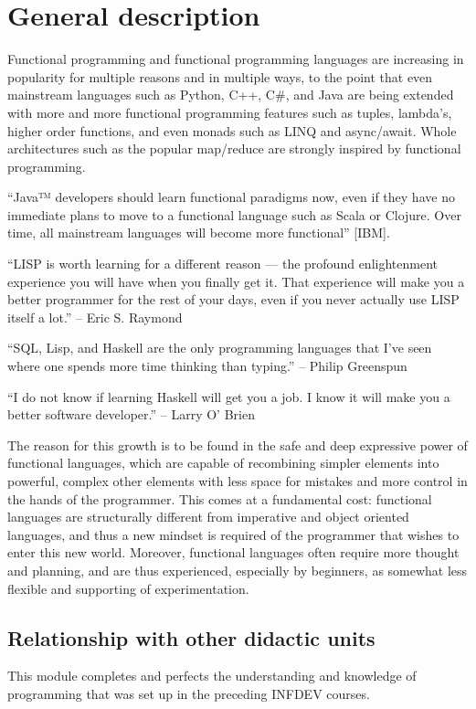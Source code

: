 \section{General description}

Functional programming and functional programming languages are increasing in popularity for multiple reasons and in multiple ways, to the point that even mainstream languages such as Python, C++, C\#, and Java are being extended with more and more functional programming features such as tuples, lambda's, higher order functions, and even monads such as LINQ and async/await. Whole architectures such as the popular map/reduce are strongly inspired by functional programming.

``Java™ developers should learn functional paradigms now, even if they have no immediate plans to move to a functional language such as Scala or Clojure. Over time, all mainstream languages will become more functional'' [IBM].

``LISP is worth learning for a different reason — the profound enlightenment experience you will have when you finally get it. That experience will make you a better programmer for the rest of your days, even if you never actually use LISP itself a lot.'' – Eric S. Raymond

``SQL, Lisp, and Haskell are the only programming languages that I've seen where one spends more time thinking than typing.'' – Philip Greenspun

``I do not know if learning Haskell will get you a job. I know it will make you a better software developer.'' – Larry O’ Brien

The reason for this growth is to be found in the safe and deep expressive power of functional languages, which are capable of recombining simpler elements into powerful, complex other elements with less space for mistakes and more control in the hands of the programmer. This comes at a fundamental cost: functional languages are structurally different from imperative and object oriented languages, and thus a new mindset is required of the programmer that wishes to enter this new world. Moreover, functional languages often require more thought and planning, and are thus experienced, especially by beginners, as somewhat less flexible and supporting of experimentation.

\subsection{Relationship with other didactic units}
This module completes and perfects the understanding and knowledge of programming that was set up in the preceding INFDEV courses.
